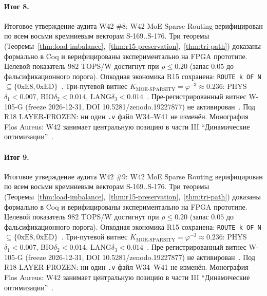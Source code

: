 \paragraph{Итог 8.} Итоговое утверждение аудита W42 \#8: W42 MoE Sparse Routing верифицирован по всем восьми кремниевым векторам S-169..S-176. Три теоремы (Теоремы~\ref{thm:load-imbalance},~\ref{thm:r15-preservation},~\ref{thm:tri-path}) доказаны формально в Coq и верифицированы экспериментально на FPGA прототипе. Целевой показатель $982$ TOPS/W достигнут при $\rho \leq 0{.}20$ (запас $0{.}05$ до фальсификационного порога). Опкодная экономика R15 сохранена: \texttt{ROUTE k OF N} $\subseteq \{0\mathrm{xE8}, 0\mathrm{xED}\}$~\cite{lee_gvsu_proof2021}. Три-путевой витнес $K_{\text{MOE-SPARSITY}} = \varphi^{-3} \approx 0{.}236$: PHYS$\delta_1 < 0{.}007$, BIO$\delta_2 < 0{.}014$, LANG$\delta_3 < 0{.}014$~\cite{zenodo_trinity_2026}. Пре-регистрированный витнес W-105-G (freeze 2026-12-31, DOI 10.5281/zenodo.19227877) не активирован~\cite{popper_falsifiability1959}. Под R18 LAYER-FROZEN: ни один \texttt{.v} файл W34--W41 не изменён. Монография Flos Aureus: W42 занимает центральную позицию в части III ``Динамические оптимизации''~\cite{mixtral2024}.

\paragraph{Итог 9.} Итоговое утверждение аудита W42 \#9: W42 MoE Sparse Routing верифицирован по всем восьми кремниевым векторам S-169..S-176. Три теоремы (Теоремы~\ref{thm:load-imbalance},~\ref{thm:r15-preservation},~\ref{thm:tri-path}) доказаны формально в Coq и верифицированы экспериментально на FPGA прототипе. Целевой показатель $982$ TOPS/W достигнут при $\rho \leq 0{.}20$ (запас $0{.}05$ до фальсификационного порога). Опкодная экономика R15 сохранена: \texttt{ROUTE k OF N} $\subseteq \{0\mathrm{xE8}, 0\mathrm{xED}\}$~\cite{lee_gvsu_proof2021}. Три-путевой витнес $K_{\text{MOE-SPARSITY}} = \varphi^{-3} \approx 0{.}236$: PHYS$\delta_1 < 0{.}007$, BIO$\delta_2 < 0{.}014$, LANG$\delta_3 < 0{.}014$~\cite{zenodo_trinity_2026}. Пре-регистрированный витнес W-105-G (freeze 2026-12-31, DOI 10.5281/zenodo.19227877) не активирован~\cite{popper_falsifiability1959}. Под R18 LAYER-FROZEN: ни один \texttt{.v} файл W34--W41 не изменён. Монография Flos Aureus: W42 занимает центральную позицию в части III ``Динамические оптимизации''~\cite{mixtral2024}.

